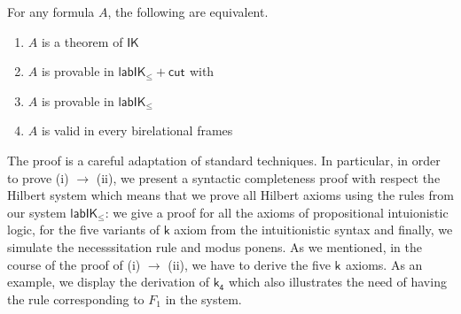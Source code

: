 \documentclass[twoside]{aiml18}
\newcommand{\todo}[1]{{\color{red}[TODO: #1]}}
\newcommand{\B}{\mathcal{B}}
\newcommand*{\ax}[1]{\mathsf{#1}}
\newcommand*{\kax}[1][]		{\ax{k_{#1}}}
\newcommand*{\lab}{\mathsf{lab}}
\newcommand*{\IK}{\mathsf{IK}}
\newcommand*{\labIKp}{\lab\IK_{\le}}
\newcommand*{\labels}[2]{{\color{blue}{#1}\:\colon}{#2}}
\newcommand{\SEQ}{\Rightarrow}
\newcommand*{\rn}[1]  {\ensuremath{\mathsf{#1}}}
\newcommand*{\labrn}[2][]  {\rn{#2}_{#1}}%
\begin{document}

\begin{theorem}\label{thm:cutfree-compl}
	For any formula $A$, the following are equivalent.
	\begin{enumerate}
		\item\label{i} $A$ is a theorem of $\IK$ 
		\item\label{ii} $A$ is provable in $\labIKp +\labrn{cut}$ with %
%		
		\smash{%
			\scalebox{.9}{$\vliinf{\labrn{cut}}{}{\B_1, \B_2, \Left \SEQ \Right}{\B_1, \Left \SEQ \Right, \labels{z}{C}}{\B_2, \Left, \labels{z}{C} \SEQ \Right}$}
		}%
		\item\label{iii} $A$ is provable in $\labIKp$
		\item\label{iv} $A$ is valid in every birelational frames %
	\end{enumerate}
\end{theorem}

%
%
%
%
%

The proof is a careful adaptation of standard techniques.
%
In particular, in order to prove (i) $\rightarrow$ (ii), we present a syntactic completeness proof with respect the Hilbert system which means that we prove all Hilbert axioms using the rules from our system $\labIKp$: we give a proof for all the axioms of propositional intuionistic logic, for the five variants of $\mathsf{k}$ axiom from the intuitionistic syntax and finally, we simulate the necesssitation rule and modus ponens. As we mentioned, in the course of the proof of (i) $\rightarrow$ (ii), we have to derive the five $\kax$ axioms. 
%
As an example, we display the derivation of $\kax[4]$ which also illustrates the need of having the rule corresponding to $F_1$ in the system.
\end{document}
